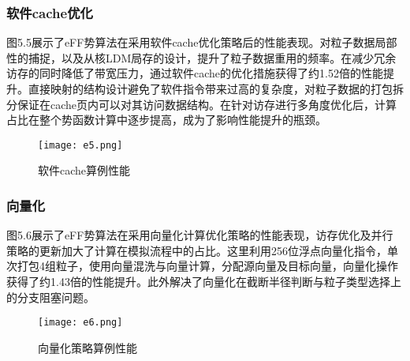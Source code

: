 \subsubsection{软件cache优化}
图5.5展示了eFF势算法在采用软件cache优化策略后的性能表现。对粒子数据局部性的捕捉，以及从核LDM局存的设计，提升了粒子数据重用的频率。在减少冗余访存的同时降低了带宽压力，通过软件cache的优化措施获得了约1.52倍的性能提升。直接映射的结构设计避免了软件指令带来过高的复杂度，对粒子数据的打包拆分保证在cache页内可以对其访问数据结构。在针对访存进行多角度优化后，计算占比在整个势函数计算中逐步提高，成为了影响性能提升的瓶颈。
 \begin{figure}[h]
  \centering
  \texttt{[image: e5.png]}
  \caption{软件cache算例性能}
\end{figure}

\subsubsection{向量化}
图5.6展示了eFF势算法在采用向量化计算优化策略的性能表现，访存优化及并行策略的更新加大了计算在模拟流程中的占比。这里利用256位浮点向量化指令，单次打包4组粒子，使用向量混洗与向量计算，分配源向量及目标向量，向量化操作获得了约1.43倍的性能提升。此外解决了向量化在截断半径判断与粒子类型选择上的分支阻塞问题。
 \begin{figure}[h]
  \centering
  \texttt{[image: e6.png]}
  \caption{向量化策略算例性能}
\end{figure}


